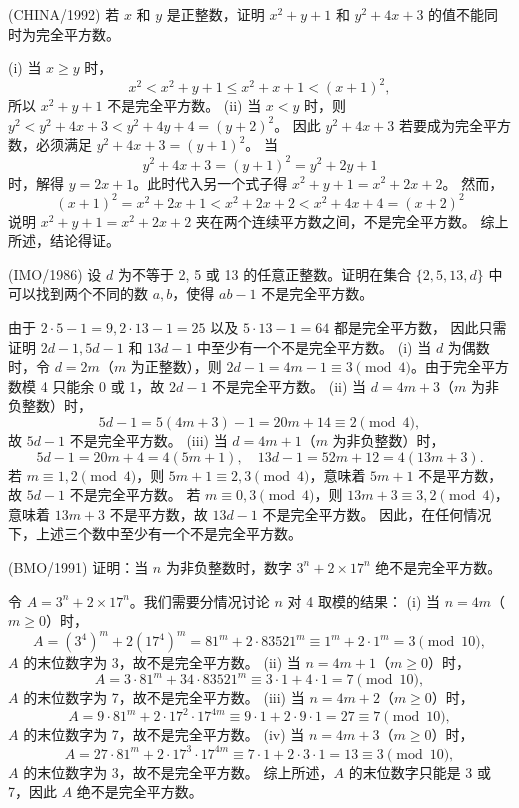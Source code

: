 \begin{questions}
\question (CHINA/1992) 若 $x$ 和 $y$ 是正整数，证明 $x^2 + y + 1$ 和 $y^2 + 4x + 3$ 的值不能同时为完全平方数。
\begin{solution}
(i) 当 $x \ge y$ 时，
\[
x^2 < x^2 + y + 1 \le x^2 + x + 1 < (x + 1)^2,
\]
所以 $x^2 + y + 1$ 不是完全平方数。
(ii) 当 $x < y$ 时，则 $y^2 < y^2 + 4x + 3 < y^2 + 4y + 4 = (y + 2)^2$。
因此 $y^2 + 4x + 3$ 若要成为完全平方数，必须满足 $y^2 + 4x + 3 = (y + 1)^2$。
当
\[
y^2 + 4x + 3 = (y + 1)^2 = y^2 + 2y + 1
\]
时，解得 $y = 2x + 1$。此时代入另一个式子得 $x^2 + y + 1 = x^2 + 2x + 2$。
然而，
\[
(x + 1)^2 = x^2 + 2x + 1 < x^2 + 2x + 2 < x^2 + 4x + 4 = (x + 2)^2
\]
说明 $x^2 + y + 1 = x^2 + 2x + 2$ 夹在两个连续平方数之间，不是完全平方数。
综上所述，结论得证。
\end{solution}

\question (IMO/1986) 设 $d$ 为不等于 2, 5 或 13 的任意正整数。证明在集合 $\{2, 5, 13, d\}$ 中可以找到两个不同的数 $a, b$，使得 $ab - 1$ 不是完全平方数。
\begin{solution}
由于 $2 \cdot 5 - 1 = 9, 2 \cdot 13 - 1 = 25$ 以及 $5 \cdot 13 - 1 = 64$ 都是完全平方数，
因此只需证明 $2d - 1, 5d - 1$ 和 $13d - 1$ 中至少有一个不是完全平方数。
(i) 当 $d$ 为偶数时，令 $d = 2m$（$m$ 为正整数），则 $2d - 1 = 4m - 1 \equiv 3 \pmod{4}$。由于完全平方数模 4 只能余 0 或 1，故 $2d - 1$ 不是完全平方数。
(ii) 当 $d = 4m + 3$（$m$ 为非负整数）时，
\[
5d - 1 = 5(4m + 3) - 1 = 20m + 14 \equiv 2 \pmod{4},
\]
故 $5d - 1$ 不是完全平方数。
(iii) 当 $d = 4m + 1$（$m$ 为非负整数）时，
\[
5d - 1 = 20m + 4 = 4(5m + 1), \quad 13d - 1 = 52m + 12 = 4(13m + 3).
\]
若 $m \equiv 1, 2 \pmod{4}$，则 $5m + 1 \equiv 2, 3 \pmod{4}$，意味着 $5m + 1$ 不是平方数，故 $5d - 1$ 不是完全平方数。
若 $m \equiv 0, 3 \pmod{4}$，则 $13m + 3 \equiv 3, 2 \pmod{4}$，意味着 $13m + 3$ 不是平方数，故 $13d - 1$ 不是完全平方数。
因此，在任何情况下，上述三个数中至少有一个不是完全平方数。
\end{solution}

\question (BMO/1991) 证明：当 $n$ 为非负整数时，数字 $3^n + 2 \times 17^n$ 绝不是完全平方数。
\begin{solution}
令 $A = 3^n + 2 \times 17^n$。我们需要分情况讨论 $n$ 对 4 取模的结果：
(i) 当 $n = 4m$（$m \ge 0$）时，
\[
A = (3^4)^m + 2(17^4)^m = 81^m + 2 \cdot 83521^m \equiv 1^m + 2 \cdot 1^m = 3 \pmod{10},
\]
$A$ 的末位数字为 3，故不是完全平方数。
(ii) 当 $n = 4m + 1$（$m \ge 0$）时，
\[
A = 3 \cdot 81^m + 34 \cdot 83521^m \equiv 3 \cdot 1 + 4 \cdot 1 = 7 \pmod{10},
\]
$A$ 的末位数字为 7，故不是完全平方数。
(iii) 当 $n = 4m + 2$（$m \ge 0$）时，
\[
A = 9 \cdot 81^m + 2 \cdot 17^2 \cdot 17^{4m} \equiv 9 \cdot 1 + 2 \cdot 9 \cdot 1 = 27 \equiv 7 \pmod{10},
\]
$A$ 的末位数字为 7，故不是完全平方数。
(iv) 当 $n = 4m + 3$（$m \ge 0$）时，
\[
A = 27 \cdot 81^m + 2 \cdot 17^3 \cdot 17^{4m} \equiv 7 \cdot 1 + 2 \cdot 3 \cdot 1 = 13 \equiv 3 \pmod{10},
\]
$A$ 的末位数字为 3，故不是完全平方数。
综上所述，$A$ 的末位数字只能是 3 或 7，因此 $A$ 绝不是完全平方数。
\end{solution}


\end{questions}
